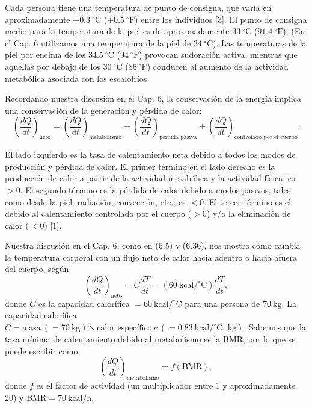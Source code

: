 \documentclass[12pt]{book}
\begin{document}
Cada persona tiene una temperatura de punto de consigna, que varía en aproximadamente $\pm0.3\ ^\circ\text{C}$ ($\pm0.5\ ^\circ\text{F}$) entre los individuos [3]. El punto de consigna medio para la temperatura de la piel es de aproximadamente $33\ ^\circ\text{C}$ ($91.4\ ^\circ\text{F}$). (En el Cap. 6 utilizamos una temperatura de la piel de $34\ ^\circ\text{C}$). Las temperaturas de la piel por encima de los $34.5\ ^\circ\text{C}$ ($94\ ^\circ\text{F}$) provocan sudoración activa, mientras que aquellas por debajo de los $30\ ^\circ\text{C}$ ($86\ ^\circ\text{F}$) conducen al aumento de la actividad metabólica asociada con los escalofríos.

Recordando nuestra discusión en el Cap. 6, la conservación de la energía implica una conservación de la generación y pérdida de calor:
\begin{equation}
  \left( \frac{dQ}{dt} \right)_{\text{neto}} = \left( \frac{dQ}{dt} \right)_{\text{metabolismo}} + \left( \frac{dQ}{dt} \right)_{\text{pérdida pasiva}} + \left( \frac{dQ}{dt} \right)_{\text{controlado por el cuerpo}}. \label{eq:13.10}
\end{equation}

El lado izquierdo es la tasa de calentamiento neta debido a todos los modos de producción y pérdida de calor. El primer término en el lado derecho es la producción de calor a partir de la actividad metabólica y la actividad física; es $>0$. El segundo término es la pérdida de calor debido a modos pasivos, tales como desde la piel, radiación, convección, etc.; es $<0$. El tercer término es el debido al calentamiento controlado por el cuerpo ($>0$) y/o la eliminación de calor ($<0$) [1].

Nuestra discusión en el Cap. 6, como en (6.5) y (6.36), nos mostró cómo cambia la temperatura corporal con un flujo neto de calor hacia adentro o hacia afuera del cuerpo, según
\begin{equation}
  \left( \frac{dQ}{dt} \right)_{\text{neto}} = C \frac{dT}{dt} = (60\ \text{kcal}/^\circ\text{C}) \frac{dT}{dt}, \label{eq:13.11}
\end{equation}
donde $C$ es la capacidad calorífica $= 60\ \text{kcal}/^\circ\text{C}$ para una persona de $70\ \text{kg}$. La capacidad calorífica $C = \text{masa}\ (=70\ \text{kg}) \times \text{calor específico}\ c\ (= 0.83\ \text{kcal}/^\circ\text{C}\cdot\text{kg})$. Sabemos que la tasa mínima de calentamiento debido al metabolismo es la BMR, por lo que se puede escribir como
\begin{equation}
  \left( \frac{dQ}{dt} \right)_{\text{metabolismo}} = f (\text{BMR}), \label{eq:13.12}
\end{equation}
donde $f$ es el factor de actividad (un multiplicador entre 1 y aproximadamente 20) y $\text{BMR} = 70\ \text{kcal/h}$.
\end{document}
